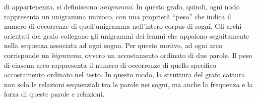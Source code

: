 \begin{enumerate}
          di appartenenza, si definiscono \textit{unigrammi}. In questo grafo, quindi, ogni nodo rappresenta
          un unigramma univoco, con una proprietà ``peso'' che indica il numero di occorrenze di quell'unigramma
          nell'intero corpus di sogni.
          Gli archi orientati del grafo collegano gli unigrammi dei lemmi che appaiono seguitamente nella
          sequenza associata ad ogni sogno. Per questo motivo, ad ogni arco corrisponde un \textit{bigramma}, ovvero
          un accostamento ordinato di due parole.
          Il peso di ciascun arco rappresenta il numero di occorrenze di quello specifico accostamento ordinato nel testo.
          In questo modo, la struttura del grafo cattura non solo le relazioni sequenziali tra le parole nei sogni,
          ma anche la frequenza e la forza di queste parole e relazioni.
\end{enumerate}